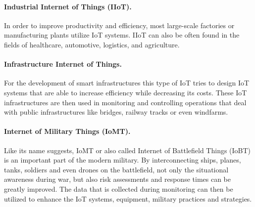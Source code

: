 \paragraph{Industrial Internet of Things (IIoT).}
In order to improve productivity and efficiency, most large-scale factories or manufacturing plants utilize IoT systems. IIoT can also be often found in the fields of healthcare, automotive, logistics, and agriculture. 

\paragraph{Infrastructure Internet of Things.}
For the development of smart infrastructures this type of IoT tries to design IoT systems that are able to increase efficiency while decreasing its costs. These IoT infrastructures are then used in monitoring and controlling operations that deal with public infrastructures like bridges, railway tracks or even windfarms.

\paragraph{Internet of Military Things (IoMT).}
Like its name suggests, IoMT or also called Internet of Battlefield Things (IoBT) is an important part of the modern military. By interconnecting ships, planes, tanks, soldiers and even drones on the battlefield, not only the situational awareness during war, but also risk assessments and response times can be greatly improved. The data that is collected during monitoring can then be utilized to enhance the IoT systems, equipment, military practices and strategies. 
